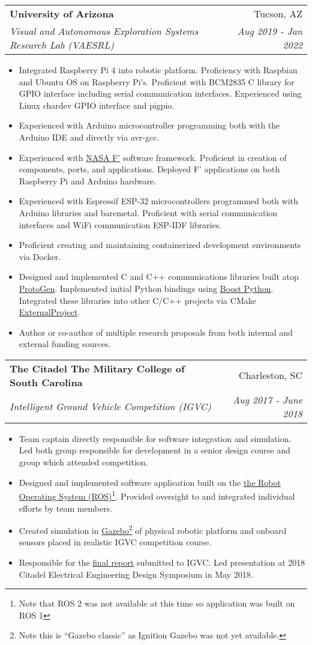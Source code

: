 \documentclass[letterpaper,11pt]{article}
\makeatletter
\newcommand{\resumeBullet}[1]{
\item\small{
    {#1 \vspace{-2pt}}
  }
}
\newcommand{\resumeSubheading}[4]{
  \vspace{-1pt}\item
  \begin{tabular*}{0.97\textwidth}{l@{\extracolsep{\fill}}r}
    \textbf{#1} & #2 \\
    \textit{\small#3} & \textit{\small #4} \\
  \end{tabular*}\vspace{-5pt}
}
\newcommand{\resumeItemListStart}{\begin{itemize}}
\newcommand{\resumeItemListEnd}{\end{itemize}\vspace{-5pt}}
\makeatother
\begin{document}
\resumeSubheading
{University of Arizona}{Tucson, AZ}
{Visual and Autonomous Exploration Systems Research Lab (VAESRL)}{Aug 2019 - Jan 2022}

\resumeItemListStart
\resumeBullet{Integrated Raspberry Pi 4 into robotic platform. Proficiency with Raspbian and Ubuntu OS on Raspberry Pi's. Proficient with BCM2835 C library for GPIO interface including serial communication interfaces. Experienced using Linux chardev GPIO interface and pigpio.}
\resumeBullet{Experienced with Arduino microcontroller programming both with the Arduino IDE and directly via avr-gcc.}
\resumeBullet{Experienced with \href{https://nasa.github.io/fprime/}{NASA F'} software framework. Proficient in creation of components, ports, and applications. Deployed F' applications on both Raspberry Pi and Arduino hardware.}
\resumeBullet{Experienced with Espressif ESP-32 microcontrollers programmed both with Arduino libraries and baremetal. Proficient with serial communication interfaces and WiFi communication ESP-IDF libraries.}
\resumeBullet{Proficient creating and maintaining containerized development environments via Docker.}
\resumeBullet{Designed and implemented C and C++ communications libraries built atop \href{https://github.com/billvaglienti/ProtoGen}{ProtoGen}. Implemented initial Python bindings using \href{https://www.boost.org/doc/libs/1_78_0/libs/python/doc/html/index.html}{Boost Python}. Integrated these libraries into other C/C++ projects via CMake \href{https://cmake.org/cmake/help/latest/module/ExternalProject.html}{ExternalProject}.}
\resumeBullet{Author or co-author of multiple research proposals from both internal and external funding sources.}
\resumeItemListEnd

\resumeSubheading
{The Citadel The Military College of South Carolina}{Charleston, SC}
{Intelligent Ground Vehicle Competition (IGVC)}{Aug 2017 - June 2018}

\resumeItemListStart
\resumeBullet{Team captain directly responsible for software integration and simulation. Led both group responsible for development in a senior design course and group which attended competition.}
\resumeBullet{Designed and implemented software application built on the \href{https://www.ros.org}{the Robot Operating System (ROS)}\footnote{Note that ROS 2 was not available at this time so application was built on ROS 1}. Provided oversight to and integrated individual efforts by team members.}
\resumeBullet{Created simulation in \href{http://gazebosim.org}{Gazebo}\footnote{Note this is ``Gazebo classic'' as Ignition Gazebo was not yet available.} of physical robotic platform and onboard sensors placed in realistic IGVC competition course.}
\resumeBullet{Responsible for the \href{http://igvc.secs.oakland.edu/design/2018/16.pdf}{final report} submitted to IGVC. Led presentation at 2018 Citadel Electrical Engineering Design Symposium in May 2018.}
\resumeItemListEnd
\end{document}
